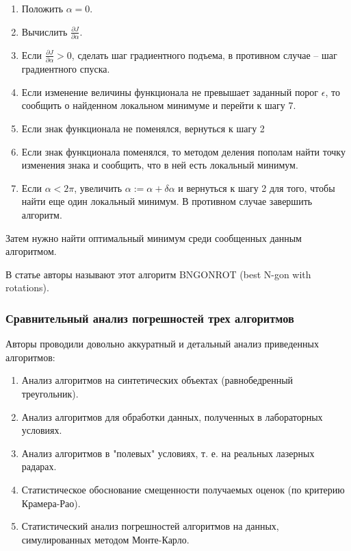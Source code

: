 \documentclass[a4paper, 12pt, titlepage]{article}
\theoremstyle{definition}
\theoremstyle{plain}
\begin{document}
\begin{enumerate}
 \item Положить $\alpha = 0$.
 \item Вычислить $\frac{\partial J}{\partial \alpha}$.
 \item Если $\frac{\partial J}{\partial \alpha} > 0$, сделать шаг градиентного 
подъема, в противном случае -- шаг градиентного спуска.
 \item Если изменение величины функционала не превышает заданный порог
$\epsilon$, то сообщить о найденном локальном минимуме и перейти к шагу 7.
 \item Если знак функционала не поменялся, вернуться к шагу 2
 \item Если знак функционала поменялся, то методом деления пополам найти точку 
изменения знака и сообщить, что в ней есть локальный минимум.
 \item Если $\alpha < 2 \pi$, увеличить $\alpha := \alpha + \delta \alpha$ и
вернуться к шагу 2 для того, чтобы найти еще один локальный минимум. В противном
случае завершить алгоритм.
\end{enumerate}

Затем нужно найти оптимальный минимум среди сообщенных данным алгоритмом.

В статье авторы называют этот алгоритм BNGONROT (best N-gon with rotations).

\subsubsection{Сравнительный анализ погрешностей трех алгоритмов}
\label{sec:history/LeleKW92/analysis}

Авторы проводили довольно аккуратный и детальный анализ приведенных алгоритмов:

\begin{enumerate}
 \item Анализ алгоритмов на синтетических объектах (равнобедренный треугольник).
 \item Анализ алгоритмов для обработки данных, полученных в лабораторных
условиях.
 \item Анализ алгоритмов в "полевых" условиях, т. е. на реальных лазерных
радарах.
 \item Статистическое обоснование смещенности получаемых оценок (по критерию
Крамера-Рао).
 \item Статистический анализ погрешностей алгоритмов на данных, симулированных
методом Монте-Карло.
\end{enumerate}
\end{document}
